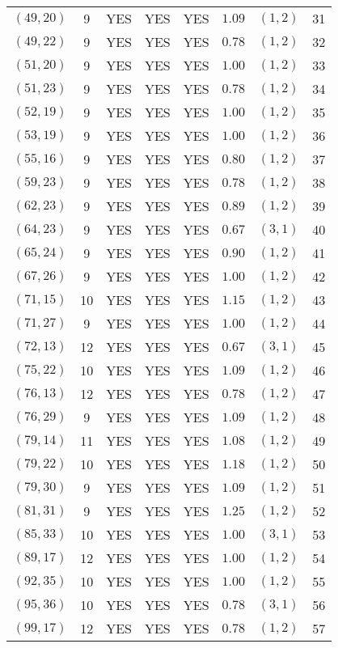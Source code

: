 \begin{longtable}{|c|c|c|c|c|c|c|c|}
$(49,20)$ & 9 & YES & YES & YES & $1.09$ & $(1,2)$ & 31\\
$(49,22)$ & 9 & YES & YES & YES & $0.78$ & $(1,2)$ & 32\\
$(51,20)$ & 9 & YES & YES & YES & $1.00$ & $(1,2)$ & 33\\
$(51,23)$ & 9 & YES & YES & YES & $0.78$ & $(1,2)$ & 34\\
$(52,19)$ & 9 & YES & YES & YES & $1.00$ & $(1,2)$ & 35\\
$(53,19)$ & 9 & YES & YES & YES & $1.00$ & $(1,2)$ & 36\\
$(55,16)$ & 9 & YES & YES & YES & $0.80$ & $(1,2)$ & 37\\
$(59,23)$ & 9 & YES & YES & YES & $0.78$ & $(1,2)$ & 38\\
$(62,23)$ & 9 & YES & YES & YES & $0.89$ & $(1,2)$ & 39\\
$(64,23)$ & 9 & YES & YES & YES & $0.67$ & $(3,1)$ & 40\\
$(65,24)$ & 9 & YES & YES & YES & $0.90$ & $(1,2)$ & 41\\
$(67,26)$ & 9 & YES & YES & YES & $1.00$ & $(1,2)$ & 42\\
$(71,15)$ & 10 & YES & YES & YES & $1.15$ & $(1,2)$ & 43\\
$(71,27)$ & 9 & YES & YES & YES & $1.00$ & $(1,2)$ & 44\\
$(72,13)$ & 12 & YES & YES & YES & $0.67$ & $(3,1)$ & 45\\
$(75,22)$ & 10 & YES & YES & YES & $1.09$ & $(1,2)$ & 46\\
$(76,13)$ & 12 & YES & YES & YES & $0.78$ & $(1,2)$ & 47\\
$(76,29)$ & 9 & YES & YES & YES & $1.09$ & $(1,2)$ & 48\\
$(79,14)$ & 11 & YES & YES & YES & $1.08$ & $(1,2)$ & 49\\
$(79,22)$ & 10 & YES & YES & YES & $1.18$ & $(1,2)$ & 50\\
$(79,30)$ & 9 & YES & YES & YES & $1.09$ & $(1,2)$ & 51\\
$(81,31)$ & 9 & YES & YES & YES & $1.25$ & $(1,2)$ & 52\\
$(85,33)$ & 10 & YES & YES & YES & $1.00$ & $(3,1)$ & 53\\
$(89,17)$ & 12 & YES & YES & YES & $1.00$ & $(1,2)$ & 54\\
$(92,35)$ & 10 & YES & YES & YES & $1.00$ & $(1,2)$ & 55\\
$(95,36)$ & 10 & YES & YES & YES & $0.78$ & $(3,1)$ & 56\\
$(99,17)$ & 12 & YES & YES & YES & $0.78$ & $(1,2)$ & 57\\

\end{longtable}
